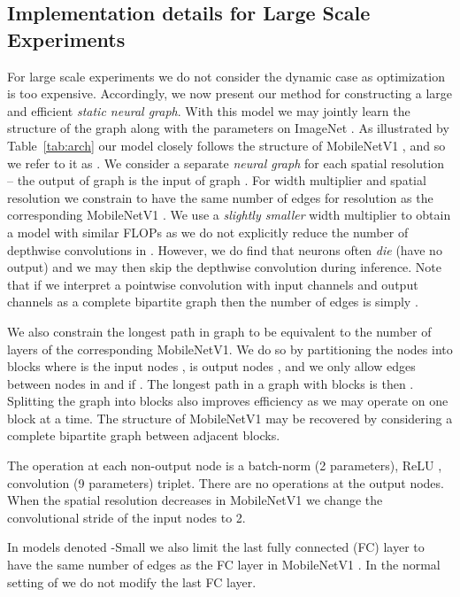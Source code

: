 \documentclass{article}
\begin{document}
\subsection{Implementation details for Large Scale Experiments} \label{sec:impl}
For large scale experiments we do not consider the dynamic case as optimization is too expensive. Accordingly, we now present our method for constructing a large and efficient \textit{static neural graph}. With this model we may jointly learn the structure of the graph along with the parameters on ImageNet \cite{imagenet}. As illustrated by Table~\ref{tab:arch} our model closely follows the structure of MobileNetV1 \cite{mobilenetv1}, and so we refer to it as . We consider a separate \textit{neural graph} for each spatial resolution -- the output of graph  is the input of graph . For width multiplier \cite{mobilenetv1}  and spatial resolution  we constrain  to have the same number of edges for resolution  as the corresponding MobileNetV1 . We use a \textit{slightly smaller} width multiplier to obtain a model with similar FLOPs as we do not explicitly reduce the number of depthwise convolutions in . However, we do find that neurons often \textit{die} (have no output) and we may then skip the depthwise convolution during inference. Note that if we interpret a pointwise convolution with  input channels and  output channels as a complete bipartite graph then the number of edges is simply .

We also constrain the longest path in graph  to be equivalent to the number of layers of the corresponding MobileNetV1. We do so by partitioning the nodes  into blocks  where  is the input nodes ,  is output nodes , and we only allow edges between nodes in  and  if . The longest path in a graph with  blocks is then . Splitting the graph into blocks also improves efficiency as we may operate on one block at a time. The structure of MobileNetV1 may be recovered by considering a complete bipartite graph between adjacent blocks.

The operation  at each non-output node is a batch-norm \cite{batchnorm} (2 parameters), ReLU \cite{alexnet},  convolution (9 parameters) triplet. There are no operations at the output nodes. When the spatial resolution decreases in MobileNetV1 we change the convolutional stride of the input nodes to 2. 

In models denoted -Small  we also limit the last fully connected (FC) layer to have the same number of edges as the FC layer in MobileNetV1 . In the normal setting of  we do not modify the last FC layer.
\end{document}
